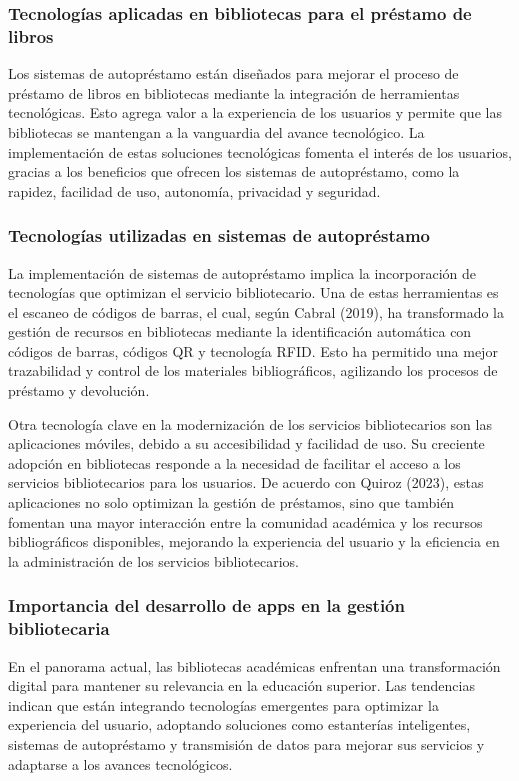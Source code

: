 \documentclass[spanish]{ieee_upb}
\begin{document}
\subsubsection{Tecnologías aplicadas en bibliotecas para el préstamo de libros}
Los sistemas de autopréstamo están diseñados para mejorar el proceso de préstamo de libros en bibliotecas mediante la integración de herramientas tecnológicas. Esto agrega valor a la experiencia de los usuarios y permite que las bibliotecas se mantengan a la vanguardia del avance tecnológico. La implementación de estas soluciones tecnológicas fomenta el interés de los usuarios, gracias a los beneficios que ofrecen los sistemas de autopréstamo, como la rapidez, facilidad de uso, autonomía, privacidad y seguridad.\cite{rodriguez2015automatizacion}

\subsubsection{Tecnologías utilizadas en sistemas de autopréstamo}
La implementación de sistemas de autopréstamo implica la incorporación de tecnologías que optimizan el servicio bibliotecario. Una de estas herramientas es el escaneo de códigos de barras, el cual, según Cabral (2019), ha transformado la gestión de recursos en bibliotecas mediante la identificación automática con códigos de barras, códigos QR y tecnología RFID. Esto ha permitido una mejor trazabilidad y control de los materiales bibliográficos, agilizando los procesos de préstamo y devolución. \cite{cabral2017identificacion}
\vspace{0.3 cm}

Otra tecnología clave en la modernización de los servicios bibliotecarios son las aplicaciones móviles, debido a su accesibilidad y facilidad de uso. Su creciente adopción en bibliotecas responde a la necesidad de facilitar el acceso a los servicios bibliotecarios para los usuarios. De acuerdo con Quiroz (2023), estas aplicaciones no solo optimizan la gestión de préstamos, sino que también fomentan una mayor interacción entre la comunidad académica y los recursos bibliográficos disponibles, mejorando la experiencia del usuario y la eficiencia en la administración de los servicios bibliotecarios. \cite{alonso2017aplicaciones}

\subsubsection{Importancia del desarrollo de apps en la gestión bibliotecaria}
En el panorama actual, las bibliotecas académicas enfrentan una transformación digital para mantener su relevancia en la educación superior. Las tendencias indican que están integrando tecnologías emergentes para optimizar la experiencia del usuario, adoptando soluciones como estanterías inteligentes, sistemas de autopréstamo y transmisión de datos para mejorar sus servicios y adaptarse a los avances tecnológicos. \cite{unal_87281}
\vspace{0.3 cm}
\end{document}
